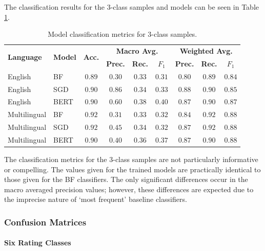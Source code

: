 The classification results for the 3-class samples and models can be seen in Table \ref{tab:Res_PU_Metric3}.

\begin{table}[ht]
    \centering
    \begin{tabular}{l l | c | c c c | c c c}
        \toprule
        \multirow{2}{*}{\textbf{Language}}&\multirow{2}{*}{\textbf{Model}}&\multirow{2}{*}{\textbf{Acc.}}&\multicolumn{3}{c}{\textbf{Macro Avg.}}&\multicolumn{3}{|c}{\textbf{Weighted Avg.}}\\
        &&&\textbf{Prec.} & \textbf{Rec.} & \textbf{$F_1$} & \textbf{Prec.} & \textbf{Rec.} & \textbf{$F_1$}\\\midrule
        English&BF&$0.89$&$0.30$&$0.33$&$0.31$&$0.80$&$0.89$&$0.84$\\
        English&SGD&$0.90$&$0.86$&$0.34$&$0.33$&$0.88$&$0.90$&$0.85$\\
        English&BERT&$\mathbf{0.90}$&$0.60$&$0.38$&$\mathbf{0.40}$&$0.87$&$0.90$&$\mathbf{0.87}$\\\midrule
        Multilingual&BF&$0.92$&$0.31$&$0.33$&$0.32$&$0.84$&$0.92$&$0.88$\\
        Multilingual&SGD&$\mathbf{0.92}$&$0.45$&$0.34$&$0.32$&$0.87$&$0.92$&$\mathbf{0.88}$\\
        Multilingual&BERT&$0.90$&$0.40$&$0.36$&$\mathbf{0.37}$&$0.87$&$0.90$&$0.88$\\
        \bottomrule
    \end{tabular}
    \caption{Model classification metrics for 3-class samples.}
    \label{tab:Res_PU_Metric3}
\end{table}

The classification metrics for the 3-class samples are not particularly informative or compelling. The values given for the trained models are practically identical to those given for the BF classifiers. The only significant differences occur in the macro averaged precision values; however, these differences are expected due to the imprecise nature of `most frequent' baseline classifiers.

\subsubsection{Confusion Matrices}

\paragraph{Six Rating Classes}

